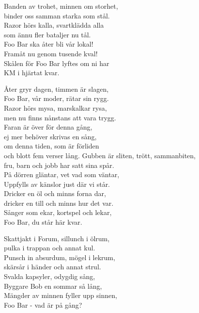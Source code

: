 Banden av trohet, minnen om storhet,\\
binder oss samman starka som stål.\\
Razor hörs kalla, svartklädda alla\\
som ännu fler bataljer nu tål.\\
Foo Bar ska åter bli vår lokal!\\
Framåt nu genom tusende kval!\\
Skålen för Foo Bar lyftes om ni har\\
KM i hjärtat kvar.

Åter gryr dagen, timmen är slagen,\\
Foo Bar, vår moder, rätar sin rygg.\\
Razor hörs mysa, marskalkar rysa,\\
men nu finns nånstans att vara trygg.\\
Faran är över för denna gång,\\
ej mer behöver skrivas en sång,\\
om denna tiden, som är förliden\\
och blott fem verser lång.
\newpage
Gubben är sliten, trött, sammanbiten,\\
fru, barn och jobb har satt sina spår.\\
På dörren gläntar, vet vad som väntar,\\
Uppfylls av känslor just där vi står.\\
Dricker en öl och minns forna dar,\\
dricker en till och minns hur det var.\\
Sånger som ekar, kortspel och lekar,\\
Foo Bar, du står här kvar.

Skattjakt i Forum, sillunch i ölrum,\\
pulka i trappan och annat kul.\\
Punsch in absurdum, mögel i lekrum,\\
skärsår i händer och annat strul.\\
Svalda kapsyler, odygdig sång,\\
Byggare Bob en sommar så lång,\\
Mängder av minnen fyller upp sinnen,\\
Foo Bar - vad är på gång?

